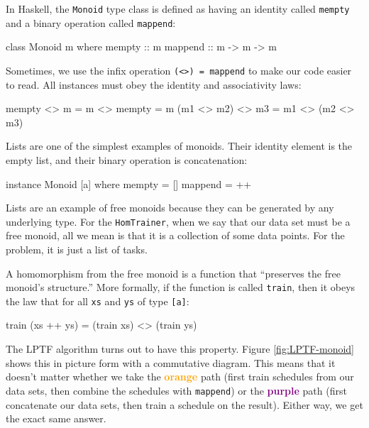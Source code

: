 \documentclass[tikz]{tmr}
\newcommand\h{\lstinline}
\newcommand{\prob}[1]{{\sc {#1}}}
\newcommand\+{\mdoubleplus}
\begin{document}
In Haskell, the \h{Monoid} type class is defined as having an identity called \h{mempty} and a binary operation called \h{mappend}:
\begin{spec}
class Monoid m where
    mempty  :: m
    mappend :: m -> m -> m
\end{spec}
Sometimes, we use the infix operation \h{(<>) = mappend} to make our code easier to read.
All instances must obey the identity and associativity laws:
\begin{spec}
mempty <> m = m <> mempty = m
(m1 <> m2) <> m3 = m1 <> (m2 <> m3)
\end{spec}
Lists are one of the simplest examples of monoids.
Their identity element is the empty list, and their binary operation is concatenation:
\begin{spec}
instance Monoid [a] where
    mempty = []
    mappend = ++
\end{spec}
Lists are an example of free monoids because they can be generated by any underlying type.
For the \h{HomTrainer}, when we say that our data set must be a free monoid, all we mean is that it is a collection of some data points.
For the \prob{Scheduling} problem, it is just a list of tasks.

A homomorphism from the free monoid is a function that ``preserves the free monoid's structure.'' %
More formally, if the function is called \h{train}, then it obeys the law that for all \lstinline{xs} and \lstinline{ys} of type \lstinline{[a]}:
\begin{spec}
train (xs ++ ys) = (train xs) <> (train ys)
\end{spec}
The LPTF algorithm turns out to have this property.
Figure \ref{fig:LPTF-monoid} shows this in picture form with a commutative diagram.
This means that it doesn't matter whether we take the \textbf{\textcolor{orange}{orange}} path (first train schedules from our data sets, then combine the schedules with \h{mappend}) or the \textbf{\textcolor{purple}{purple}} path (first concatenate our data sets, then train a schedule on the result).
Either way, we get the exact same answer.
\end{document}
